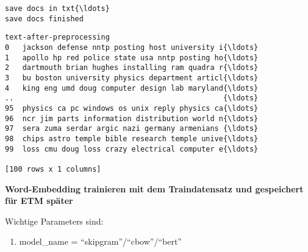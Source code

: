 \documentclass[11pt]{article}
\providecommand{\tightlist}{%
      \setlength{\itemsep}{0pt}\setlength{\parskip}{0pt}}
\newcommand{\prompt}[4]{
        \llap{{\color{#2}[#3]: #4}}\vspace{-1.25em}
    }
\begin{document}
    \begin{Verbatim}[commandchars=\\\{\}]
save docs in txt{\ldots}
save docs finished
\end{Verbatim}

            \begin{tcolorbox}[breakable, boxrule=.5pt, size=fbox, pad at break*=1mm, opacityfill=0]
\prompt{Out}{outcolor}{19}{\hspace{3.5pt}}
\begin{Verbatim}[commandchars=\\\{\}]
                             text-after-preprocessing
0   jackson defense nntp posting host university i{\ldots}
1   apollo hp red police state usa nntp posting ho{\ldots}
2   dartmouth brian hughes installing ram quadra r{\ldots}
3   bu boston university physics department articl{\ldots}
4   king eng umd doug computer design lab maryland{\ldots}
..                                                {\ldots}
95  physics ca pc windows os unix reply physics ca{\ldots}
96  ncr jim parts information distribution world n{\ldots}
97  sera zuma serdar argic nazi germany armenians {\ldots}
98  chips astro temple bible research temple unive{\ldots}
99  loss cmu doug loss crazy electrical computer e{\ldots}

[100 rows x 1 columns]
\end{Verbatim}
\end{tcolorbox}
        
    \textbf{Word-Embedding trainieren mit dem Traindatensatz und gespeichert
für ETM später}

Wichtige Parameters sind:

\begin{enumerate}
\def\labelenumi{\arabic{enumi}.}
\tightlist
\item
  model\_name = ``skipgram''/``cbow''/``bert''
\end{enumerate}
\end{document}
